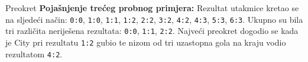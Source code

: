 \begin{statement}[
  problempoints=50,
  timelimit=1 sekunda,
  memorylimit=512 MiB,
]{Preokret}
\textbf{Pojašnjenje trećeg probnog primjera:}
Rezultat utakmice kretao se na sljedeći način: \texttt{0:0}, \texttt{1:0},
\texttt{1:1}, \texttt{1:2}, \texttt{2:2}, \texttt{3:2}, \texttt{4:2},
\texttt{4:3}, \texttt{5:3}, \texttt{6:3}. Ukupno su bila tri različita
neriješena rezultata: \texttt{0:0}, \texttt{1:1}, \texttt{2:2}. Najveći
preokret dogodio se kada je City pri rezultatu \texttt{1:2} gubio te nizom od
tri uzastopna gola na kraju vodio rezultatom \texttt{4:2}.

\end{statement}

